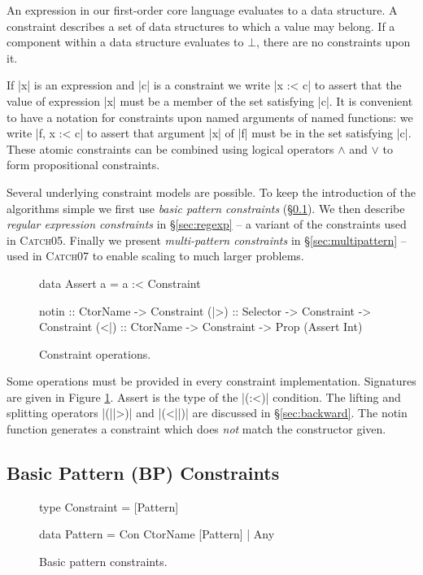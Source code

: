 \documentclass[preprint]{sigplanconf}
\newcommand{\C}[1]{\textsf{#1}}
\newcommand{\catch}{\textsc{Catch}}
\newcommand{\newtool}{\catch07}
\newcommand{\oldtool}{\catch05}
\newcommand{\ignore}{}
\begin{document}
An expression in our first-order core language evaluates to a data structure. A constraint describes a set of data structures to which a value may belong. If a component within a data structure evaluates to $\bot{}$, there are no constraints upon it.

If |x| is an expression and |c| is a constraint we write |x :< c| to assert that the value of expression |x| must be a member of the set satisfying |c|. It is convenient to have a notation for constraints upon named arguments of named functions: we write \ignore|f, x :< c| to assert that argument |x| of |f| must be in the set satisfying |c|. These atomic constraints can be combined using logical operators $\wedge{}$ and $\vee{}$ to form propositional constraints.

Several underlying constraint models are possible. To keep the introduction of the algorithms simple we first use \textit{basic pattern constraints} (\S\ref{sec:basic}). We then describe \textit{regular expression constraints} in \S\ref{sec:regexp} -- a variant of the constraints used in \oldtool{}. Finally we present \textit{multi-pattern constraints} in \S\ref{sec:multipattern} -- used in \newtool{} to enable scaling to much larger problems.

\begin{figure}
\begin{code}
data Assert a = a :< Constraint

notin :: CtorName -> Constraint
(|>) :: Selector -> Constraint -> Constraint
(<|) :: CtorName -> Constraint -> Prop (Assert Int)
\end{code}
\caption{Constraint operations.}
\label{fig:constraint}
\end{figure}

Some operations must be provided in every constraint implementation. Signatures are given in Figure \ref{fig:constraint}. \C{Assert} is the type of the |(:<)| condition. The lifting and splitting operators |(||>)| and |(<||)| are discussed in \S\ref{sec:backward}. The \C{notin} function generates a constraint which does \textit{not} match the constructor given.


\subsection{Basic Pattern (BP) Constraints}
\label{sec:basic}

\begin{figure}
\begin{code}
type Constraint = [Pattern]

data Pattern  =  Con CtorName [Pattern]
              |  Any
\end{code}
\caption{Basic pattern constraints.}
\label{fig:basic}
\end{figure}
\end{document}
